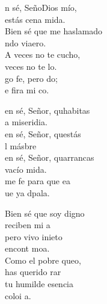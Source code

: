 \documentclass[12pt]{article}
\begin{document}
\begin{multicols*}{2}
\begin{cancion}%
	n sé, SeñoDios mío, \\
	 estás cena mida.\\
	Bien sé que me haslamado \\
	ndo viaero.\\
	A veces no te cucho, \\
	veces no te lo.\\
	go fe, pero do; \\
	e fira mi co.  \\
	\begin{chorus}%
	en sé, Señor, quhabitas \\
	a miseridia. \\
	en sé, Señor, questás\\
	l másbre\\
	en sé, Señor, quarrancas\\
	vacío mida. \\
	me fe para que ea\\
	ue ya  dpala.\\
	\end{chorus}%
	Bien sé que soy digno \\
	reciben mi a\\
	pero vivo inieto\\
	 encont  moa.\\
	Como el pobre queo, \\
	 has querido rar\\
	 tu humilde esencia \\
	 coloi a. \\
\end{cancion}%


\end{multicols*}
\end{document}

